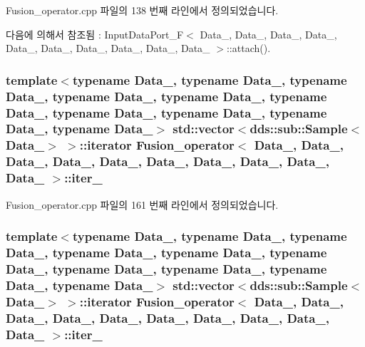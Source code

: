 Fusion\+\_\+operator.\+cpp 파일의 138 번째 라인에서 정의되었습니다.



다음에 의해서 참조됨 \+:  Input\+Data\+Port\+\_\+\+F$<$ Data\+\_, Data\+\_, Data\+\_, Data\+\_, Data\+\_, Data\+\_, Data\+\_, Data\+\_, Data\+\_, Data\+\_ $>$\+::attach().

\subsubsection[{\texorpdfstring{iter\+\_\+0}{iter_0}}]{\setlength{\rightskip}{0pt plus 5cm}template$<$typename Data\+\_, typename Data\+\_, typename Data\+\_, typename Data\+\_, typename Data\+\_, typename Data\+\_, typename Data\+\_, typename Data\+\_, typename Data\+\_, typename Data\+\_$>$ std\+::vector$<$dds\+::sub\+::\+Sample$<$Data\+\_$>$ $>$\+::iterator {\bf Fusion\+\_\+operator}$<$ Data\+\_, Data\+\_, Data\+\_, Data\+\_, Data\+\_, Data\+\_, Data\+\_, Data\+\_, Data\+\_, Data\+\_ $>$\+::iter\+\_}\hypertarget{classFusion__operator_ab0adcc22beac8918ea3e22b04f1d31d3}{}\label{classFusion__operator_ab0adcc22beac8918ea3e22b04f1d31d3}


Fusion\+\_\+operator.\+cpp 파일의 161 번째 라인에서 정의되었습니다.

\subsubsection[{\texorpdfstring{iter\+\_\+1}{iter_1}}]{\setlength{\rightskip}{0pt plus 5cm}template$<$typename Data\+\_, typename Data\+\_, typename Data\+\_, typename Data\+\_, typename Data\+\_, typename Data\+\_, typename Data\+\_, typename Data\+\_, typename Data\+\_, typename Data\+\_$>$ std\+::vector$<$dds\+::sub\+::\+Sample$<$Data\+\_$>$ $>$\+::iterator {\bf Fusion\+\_\+operator}$<$ Data\+\_, Data\+\_, Data\+\_, Data\+\_, Data\+\_, Data\+\_, Data\+\_, Data\+\_, Data\+\_, Data\+\_ $>$\+::iter\+\_}\hypertarget{classFusion__operator_a4d552a9a1ab0911598232059cb0937bc}{}\label{classFusion__operator_a4d552a9a1ab0911598232059cb0937bc}



